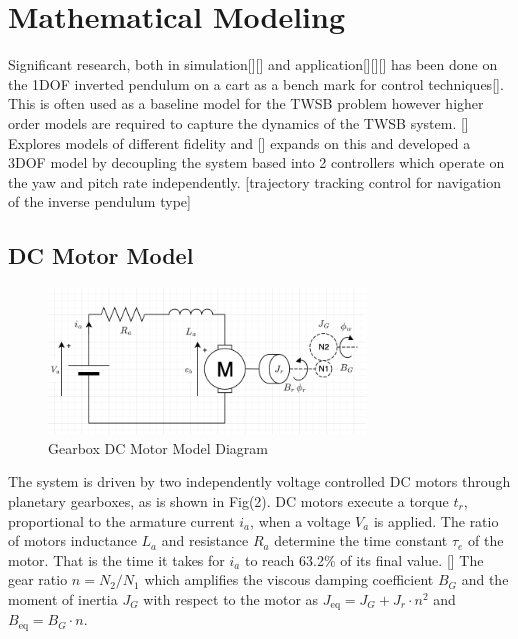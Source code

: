   \section{Mathematical Modeling} %
    Significant research, both in simulation[][] and 
    application[][][] has been done on the 1DOF inverted pendulum
    on a cart as a bench mark for control techniques[]. This is often used as a baseline model for the TWSB problem
    however higher order models are required to capture the dynamics of the TWSB system. [] Explores models of different fidelity 
    and [] expands on this and developed a 3DOF model by decoupling the system based into 2 controllers which 
    operate on the yaw and pitch rate independently. [trajectory tracking control for navigation of the inverse pendulum type] 
    \pagebreak{}
    \subsection{DC Motor Model}    
    \begin{figure}[H]
        \centering
            \includegraphics[width=0.75\textwidth]{DCMotorModel.png}
        \caption{Gearbox DC Motor Model Diagram}
    \end{figure}
    The system is driven by two independently voltage controlled DC motors through planetary gearboxes, 
    as is shown in Fig(2). 
    DC motors execute a torque $t_r$, proportional to the armature current $i_a$, when a voltage $V_a$ is applied.
    The ratio of motors inductance $L_a$ and resistance $R_a$ determine the time constant $\tau_e$ of the motor. 
    That is the time it takes for $i_a$ to reach 63.2\% of its final value. []
    The gear ratio $n=N_2/N_1$ which amplifies the viscous damping coefficient 
    $B_G$ and the moment of inertia $J_G$ with respect to the motor as $J_{\text{eq}} = J_G + J_r \cdot n^2$ and $B_{\text{eq}} = B_G \cdot n$.

